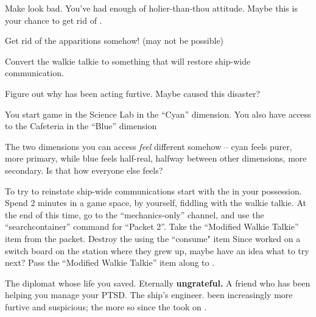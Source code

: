 \documentclass[char]{TMFHope}
\begin{document}
\begin{itemz}[Goals]
	\item Make \cDip{} look bad. You've had enough of \cDip{\their} holier-than-thou attitude. Maybe this is your chance to get rid of \cDip{\them}.
	\item Get rid of the apparitions somehow! (may not be possible)
	\item Convert the walkie talkie to something that will restore ship-wide communication.
	\item Figure out why \cEng{} has been acting furtive.  Maybe \cEng{\they} caused this disaster?
\end{itemz}

\begin{itemz}[Notes]
	\item You start game in the Science Lab in the ``Cyan'' dimension. You also have access to the Cafeteria in the ``Blue'' dimension
	\item The two dimensions you can access {\em feel} different somehow -- cyan feels purer, more primary, while blue feels half-real, halfway between other dimensions, more secondary.  Is that how everyone else feels?
	\item To try to reinstate ship-wide communications start with the \iWT{\MYname} in your possession. Spend 2 minutes in a game space, by yourself, fiddling with the walkie talkie. At the end of this time, go to the ``mechanics-only'' channel, and use the ``searchcontainer'' command for ``Packet 2''. Take the ``Modified Walkie Talkie'' item from the packet. Destroy the \iWT{\MYname} using the ``consume" item Since \cBoy{} worked on a switch board on the station where they grew up, maybe \cBoy{\they} have an idea what to try next? Pass the ``Modified Walkie Talkie'' item along to \cBoy{}.
\end{itemz}

\begin{contacts}
	\contact{\cDip{}} The diplomat whose life you saved. Eternally \textbf{ungrateful.}
	\contact{\cNav{}} A friend who has been helping you manage your PTSD.
	\contact{\cEng{}} The ship's engineer. \cEng{\They} \cEng{\have} been increasingly more furtive and suspicious; the more so since the \pNew{} took on \cBoy{}.
\end{contacts}
\end{document}
